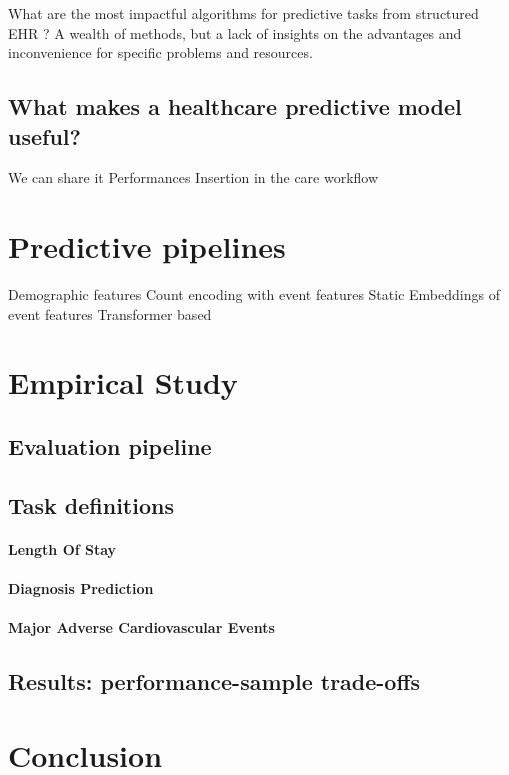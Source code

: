 \documentclass{report}
\begin{document}
What are the most impactful algorithms for predictive tasks from structured EHR ?
A wealth of methods, but a lack of insights on the advantages and inconvenience for specific problems and resources.

\subsection{What makes a healthcare predictive model useful?}\label{subsec:predictive_models:useful}

We can share it
Performances
Insertion in the care workflow


\section{Predictive pipelines}

Demographic features
Count encoding with event features
Static Embeddings of event features
Transformer based
\section{Empirical Study}\label{sec:predictive_models:empirical_study}
\subsection{Evaluation pipeline}\label{subsec:predictive_models:evaluation_pipeline}
\subsection{Task definitions}\label{subsec:predictive_models:task_definitions}

\paragraph{Length Of Stay}
\paragraph{Diagnosis Prediction}
\paragraph{Major Adverse Cardiovascular Events}
\subsection{Results: performance-sample trade-offs}

\section{Conclusion}\label{sec:predictive_models:conclusion}
\end{document}
